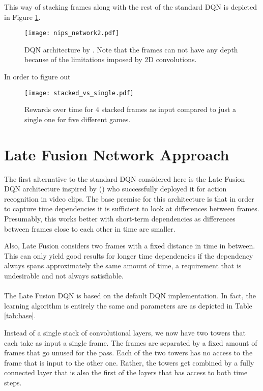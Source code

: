 This way of stacking frames along with the rest of the standard DQN
is depicted in Figure \ref{fig:nips_network2}.

\begin{figure}[htpb]
  \centering
  \texttt{[image: nips\_network2.pdf]}
  \caption{DQN architecture by \cite{Mnih2013}.
    Note that the frames can not have any depth because of
    the limitations imposed by 2D convolutions.
  }
  \label{fig:nips_network2}
\end{figure}

In order to figure out

\begin{figure}[htpb]
  \centering
  \texttt{[image: stacked\_vs\_single.pdf]}
  \caption{
    Rewards over time for 4 stacked frames as input
    compared to just a single one
    for five different games.
  }
  \label{fig:stacked_vs_single}
\end{figure}


\section{Late Fusion Network Approach}
\label{sec:late_fusion_network_approach}
The first alternative to the standard DQN
considered here is
the Late Fusion DQN architecture
inspired by \citeauthor{Karpathy2014} (\citeyear{Karpathy2014})
who successfully deployed it for
action recognition in video clips.
The base premise for this architecture
is that in order to capture time dependencies
it is sufficient to look at differences
between frames.
Presumably,
this works better with short-term dependencies
as differences between frames close to each other in time
are smaller.

Also, Late Fusion
considers two frames with a fixed distance in time in between.
This can only yield good results for longer time dependencies
if the dependency always spans approximately the same amount of time,
a requirement that is undesirable
and not always satisfiable.

\paragraph{}
The Late Fusion DQN is based on the default DQN implementation.
In fact, the learning algorithm is entirely the same
and parameters are as depicted in Table \ref{tab:base}.

Instead of a single stack of convolutional layers,
we now have two towers that each take as input a single frame.
The frames are separated by a fixed amount of frames
that go unused for the pass.
Each of the two towers has no access to the frame
that is input to the other one.
Rather, the towers get combined by a fully connected layer
that is also the first of the layers that has access
to both time steps.

